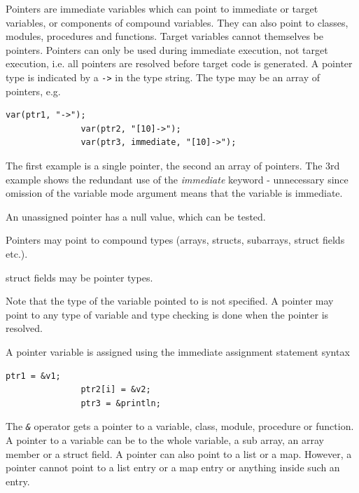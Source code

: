             Pointers are immediate variables which can point to immediate or target
            variables, or components of compound variables. They can also point to
            classes, modules, procedures and functions. Target variables cannot
            themselves be pointers. Pointers can only be used during immediate
            execution, not target execution, i.e. all pointers are resolved before
            target code is generated. A pointer type is indicated by a {\em \verb'->'}
            in the type string. The type may be an array of pointers, e.g.
            \begin{lstlisting}[gobble=12, language=threepl]
               var(ptr1, "->");
               var(ptr2, "[10]->");
               var(ptr3, immediate, "[10]->");
            \end{lstlisting}
            The first example is a single pointer, the second an array of
            pointers. The 3rd example shows the redundant use of the {\em
            immediate} keyword - unnecessary since omission of the variable
            mode argument means that the variable is immediate.

            An unassigned pointer has a null value, which can be tested.

            Pointers may point to compound types (arrays, structs, subarrays,
            struct fields etc.).

            struct fields may be pointer types.

            Note that the type of the variable pointed to is not specified. A
            pointer may point to any type of variable and type checking is
            done when the pointer is resolved.

            A pointer variable is assigned using the immediate assignment
            statement syntax
            \begin{lstlisting}[gobble=12, language=threepl]
               ptr1 = &v1;
               ptr2[i] = &v2;
               ptr3 = &println;
            \end{lstlisting}
            The {\em \verb'&'} operator gets a pointer to a variable, class, module,
            procedure or function. A pointer to a variable can be to the whole
            variable, a sub array, an array member or a struct field. A pointer can
            also point to a list or a map. However, a pointer cannot point to a list
            entry or a map entry or anything inside such an entry.
            
